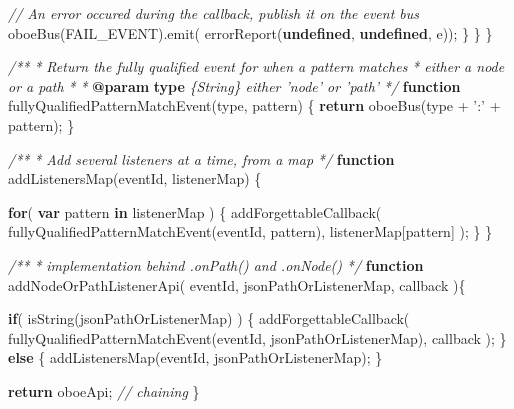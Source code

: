 \documentclass[12pt, ]{article}
\newenvironment{Shaded}{}{}
\newcommand{\KeywordTok}[1]{\textcolor[rgb]{0.00,0.44,0.13}{\textbf{{#1}}}}
\newcommand{\StringTok}[1]{\textcolor[rgb]{0.25,0.44,0.63}{{#1}}}
\newcommand{\CommentTok}[1]{\textcolor[rgb]{0.38,0.63,0.69}{\textit{{#1}}}}
\newcommand{\FunctionTok}[1]{\textcolor[rgb]{0.02,0.16,0.49}{{#1}}}
\newcommand{\NormalTok}[1]{{#1}}
\begin{document}
\begin{Shaded}
\begin{Highlighting}[]
            \CommentTok{// An error occured during the callback, publish it on the event bus }
            \FunctionTok{oboeBus}\NormalTok{(FAIL_EVENT).}\FunctionTok{emit}\NormalTok{( }\FunctionTok{errorReport}\NormalTok{(}\KeywordTok{undefined}\NormalTok{, }\KeywordTok{undefined}\NormalTok{, e));}
         \NormalTok{\}      }
      \NormalTok{\}   }
   \NormalTok{\}}

   \CommentTok{/**}
\CommentTok{    * Return the fully qualified event for when a pattern matches}
\CommentTok{    * either a node or a path}
\CommentTok{    * }
\CommentTok{    * }\KeywordTok{@param}\CommentTok{ }\KeywordTok{type}\CommentTok{ \{String\} either 'node' or 'path'}
\CommentTok{    */}      
   \KeywordTok{function} \FunctionTok{fullyQualifiedPatternMatchEvent}\NormalTok{(type, pattern) \{}
      \KeywordTok{return} \FunctionTok{oboeBus}\NormalTok{(type + }\StringTok{':'} \NormalTok{+ pattern);}
   \NormalTok{\}      }
      
   \CommentTok{/**}
\CommentTok{    * Add several listeners at a time, from a map}
\CommentTok{    */}
   \KeywordTok{function} \FunctionTok{addListenersMap}\NormalTok{(eventId, listenerMap) \{}
   
      \KeywordTok{for}\NormalTok{( }\KeywordTok{var} \NormalTok{pattern }\KeywordTok{in} \NormalTok{listenerMap ) \{}
         \FunctionTok{addForgettableCallback}\NormalTok{(}
            \FunctionTok{fullyQualifiedPatternMatchEvent}\NormalTok{(eventId, pattern), }
            \NormalTok{listenerMap[pattern]}
         \NormalTok{);}
      \NormalTok{\}}
   \NormalTok{\}    }
      
   \CommentTok{/**}
\CommentTok{    * implementation behind .onPath() and .onNode()}
\CommentTok{    */}       
   \KeywordTok{function} \FunctionTok{addNodeOrPathListenerApi}\NormalTok{( eventId, jsonPathOrListenerMap, callback )\{}
   
      \KeywordTok{if}\NormalTok{( }\FunctionTok{isString}\NormalTok{(jsonPathOrListenerMap) ) \{}
         \FunctionTok{addForgettableCallback}\NormalTok{(}
            \FunctionTok{fullyQualifiedPatternMatchEvent}\NormalTok{(eventId, jsonPathOrListenerMap),}
            \NormalTok{callback}
         \NormalTok{);}
      \NormalTok{\} }\KeywordTok{else} \NormalTok{\{}
         \FunctionTok{addListenersMap}\NormalTok{(eventId, jsonPathOrListenerMap);}
      \NormalTok{\}}
      
      \KeywordTok{return} \NormalTok{oboeApi; }\CommentTok{// chaining}
   \NormalTok{\}}
      

\end{Highlighting}
\end{Shaded}
\end{document}
